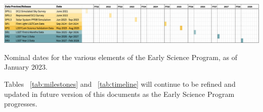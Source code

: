 \begin{table}[htb]
\label{tab:timeline}
\includegraphics[width=\linewidth]{figures/DPR-timeline}
\caption{Nominal dates for the various elements of the Early Science Program, as of January 2023.}
\end{table}

Tables ~\ref{tab:milestones} and ~\ref{tab:timeline} will continue to be refined and updated in future version of this documents as the Early Science Program progresses.
